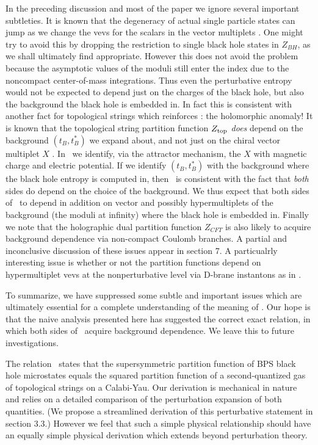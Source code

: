 In the preceding discussion and most of the paper we ignore
several important subtleties.  It is known that the degeneracy of
actual single particle states can jump as we change the vevs for
the scalars in the vector multiplets \sw . One might try to avoid
this by dropping the restriction to single black hole states in
$Z_{BH}$, as we shall ultimately find appropriate. However this
does not avoid the problem because the asymptotic values of the
moduli still enter the index due to the noncompact center-of-mass
integrations. Thus even the perturbative entropy would not be
expected to depend just on the charges of the black hole, but also
the background the black hole is embedded in. In fact this is
consistent with another fact for topological strings which
reinforces \tui :  the holomorphic anomaly!  It is known that the
topological string partition function $Z_{\rm top}$ {\it does} depend
on the background $(t_B,t_B^*)$ we expand about, and not just on
the chiral vector multiplet $X$ .
In \tui\ we identify, via
the attractor mechanism, the $X$ with magnetic charge and
electric potential. If we identify $(t_B,t_B^*)$ with the
background where the black hole entropy is computed in, then
 \tui\ is consistent
with the fact that {\it both} sides do depend on the choice of the
background.  We thus expect that both sides of \tui\ to depend in
addition on vector and possibly hypermultiplets of the background (the
moduli at infinity) where the black hole is embedded in. Finally
we note that the holographic dual partition function $Z_{CFT}$ is
also likely to acquire background dependence via non-compact
Coulomb branches. A partial and inconclusive discussion of these
issues appear in section 7. A particualrly interesting issue is
whether or not the partition functions depend on hypermultiplet
vevs at the nonperturbative level via D-brane instantons as in
.

To summarize, we have suppressed some subtle and important issues
which are ultimately essential for a complete understanding of the
meaning of \tui. Our hope is that the naive analysis presented
here has suggested the correct exact relation, in which both sides
of \tui\ acquire background dependence. We leave this to future
investigations.


The relation \tui\ states that the supersymmetric partition
function of BPS black hole microstates equals the squared
partition function of a second-quantized gas of topological
strings on a Calabi-Yau. Our derivation is mechanical in nature
and relies on a detailed comparison of the perturbation expansion
of both quantities.  (We propose a streamlined derivation of this
perturbative statement in section 3.3.) However we feel that such
a simple physical relationship should have an equally simple
physical derivation which extends beyond perturbation theory.

